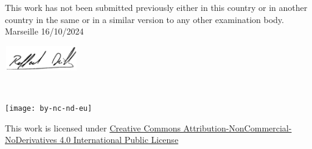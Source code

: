     This work has not been submitted previously either in this country or in another country in the same or in a similar version to any other examination body.\\
    
    Marseille 16/10/2024
    
    \begin{flushright}\includegraphics[width=120px,height=40px]{logo/signature_DULL.png}\end{flushright}%

    ~\vfill
    \begin{center}
        \begin{minipage}[c]{0.25\linewidth}
            \texttt{[image: by-nc-nd-eu]}
        \end{minipage}\hfill
    \end{center}

    This work is licensed under \href{https://creativecommons.org/licenses/by-nc-nd/4.0/deed.en}{Creative Commons Attribution-NonCommercial-NoDerivatives 4.0 International Public License}
\fi

